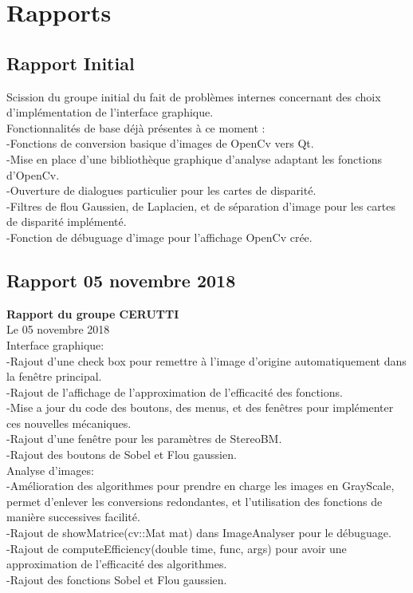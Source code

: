 \documentclass{article}
\begin{document}
\newpage
\section{Rapports}
\subsection{Rapport Initial}
Scission du groupe initial du fait de problèmes internes concernant des choix d'implémentation de l'interface graphique.\\

Fonctionnalités de base déjà présentes à ce moment :\\
	-Fonctions de conversion basique d'images de OpenCv vers Qt.\\
	-Mise en place d'une bibliothèque graphique d'analyse adaptant les fonctions d'OpenCv.\\
	-Ouverture de dialogues particulier pour les cartes de disparité.\\
	-Filtres de flou Gaussien, de Laplacien, et de séparation d'image pour les cartes de disparité implémenté.\\
	-Fonction de débuguage d'image pour l'affichage OpenCv crée.\\


\subsection{Rapport 05 novembre 2018}

\textbf{Rapport du groupe CERUTTI}\\
Le 05 novembre 2018\\

Interface graphique:\\
	-Rajout d'une check box pour remettre à l'image d'origine automatiquement dans la fenêtre principal.\\
	-Rajout de l'affichage de l'approximation de l'efficacité des fonctions.\\
	-Mise a jour du code des boutons, des menus, et des fenêtres pour implémenter ces nouvelles mécaniques.\\
	-Rajout d'une fenêtre pour les paramètres de StereoBM.\\
	-Rajout des boutons de Sobel et Flou gaussien.
\\
	
Analyse d'images:\\
	-Amélioration des algorithmes pour prendre en charge les images en GrayScale, permet d'enlever les conversions redondantes, et l'utilisation des fonctions de manière successives facilité.\\
	-Rajout de showMatrice(cv::Mat mat) dans ImageAnalyser pour le débuguage.\\
	-Rajout de computeEfficiency(double time, func, args) pour avoir une approximation de l'efficacité des algorithmes.\\
	-Rajout des fonctions Sobel et Flou gaussien.\\
\end{document}
